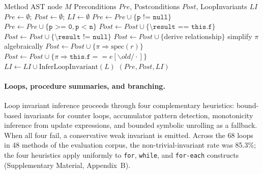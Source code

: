 \documentclass[11pt]{article}
\begin{document}
\begin{algorithm}[t]
\caption{Specification Inference via Pattern Matching}
\label{alg:inference}
\begin{algorithmic}[1]
\REQUIRE Method AST node $M$
\ENSURE Preconditions $Pre$, Postconditions $Post$, LoopInvariants $LI$
\STATE $Pre \gets \emptyset$; $Post \gets \emptyset$; $LI \gets \emptyset$
\STATE {}
        \STATE $Pre \gets Pre \cup \{\texttt{p != null}\}$
        \STATE $Pre \gets Pre \cup \{\texttt{p >= 0}, \texttt{p < n}\}$
    \ENDIF
\ENDFOR
\STATE {}
        \STATE $Post \gets Post \cup \{\texttt{\textbackslash result == this.f}\}$
        \STATE $Post \gets Post \cup \{\texttt{\textbackslash result != null}\}$
        \STATE $Post \gets Post \cup \{$derive relationship$\}$
    \ENDIF
\ENDFOR
\STATE {}
    \STATE simplify $\pi$ algebraically
    \STATE $Post \gets Post \cup \{\pi \Longrightarrow \text{spec}(r)\}$
\ENDFOR
{}
    \STATE $Post \gets Post \cup \{\pi \Longrightarrow \mathtt{this.f} == e[\backslash\mathit{old}/\cdot]\}$
\ENDFOR
\STATE {}
    \STATE $LI \gets LI \cup \text{InferLoopInvariant}(L)$
\ENDFOR
\RETURN $(Pre, Post, LI)$
\end{algorithmic}
\end{algorithm}

\paragraph{Loops, procedure summaries, and branching.}
Loop invariant inference proceeds through four complementary heuristics: bound-based invariants for counter loops, accumulator pattern detection, monotonicity inference from update expressions, and bounded symbolic unrolling as a fallback. When all four fail, a conservative weak invariant is emitted. Across the 68 loops in 48 methods of the evaluation corpus, the non-trivial-invariant rate was 85.3\%; the four heuristics apply uniformly to \texttt{for}, \texttt{while}, and \texttt{for-each} constructs (Supplementary Material, Appendix~B).
\end{document}
